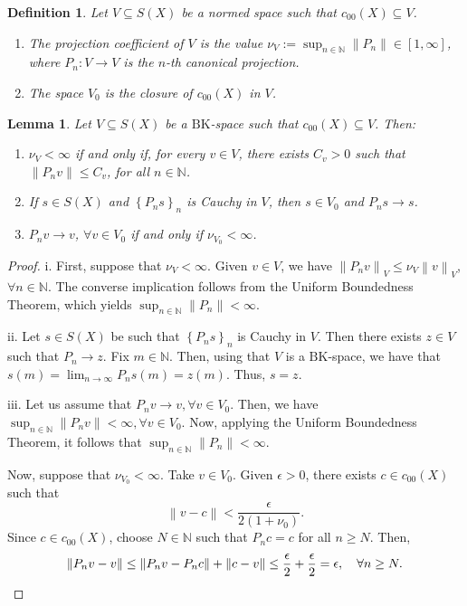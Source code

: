 \documentclass[14pt, a4paper]{article}  %
\providecommand{\llave}[1]{\left\lbrace #1\right\rbrace }
\providecommand{\pare}[1]{\left( #1\right) }
\providecommand{\norm}[1]{\left\lVert#1\right\rVert}
\newcommand{\tien}{\rightarrow}
\newcommand{\N}{\mathbb{N}}
\newcommand{\BK}{\text{BK}}
\newtheorem{lemma}{Lemma}[section]
\newtheorem{definition}{Definition}[section]
\begin{document}
	
	
	
	\begin{definition}\label{naty22}
		Let $V\subseteq S\pare{X}$ be a normed space such that $c_{00}\pare{X}\subseteq V$.
		\begin{enumerate}
			\item The \emph{projection coefficient of $V$} is the value $\nu_{V}:=\sup_{n\in \N}\norm{P_{n}}\in[1,\infty]$, where $P_{n}:V\tien V$ is the $n$-th canonical projection.
			\item The space $V_{0}$ is the closure of $c_{00}(X)$ in $V$.
		\end{enumerate}
	\end{definition}
	
	
	
 	
	
	\begin{lemma}\label{efren27_2}
		Let $V \subseteq S\pare{X}$ be a $\BK$-space such that $c_{00}\pare{X} \subseteq V$. Then:
		\begin{enumerate}
			\item[i.]  $\nu_V < \infty$ if and only if, for every $v \in V$, there exists $C_v > 0$ such that $\| P_n v \| \leq C_v$, for all $n \in \N$.
			\item[ii.] If $s \in S\pare{X}$ and $\llave{P_{n}s}_{n}$ is Cauchy in $V$, then $s \in V_{0}$ and $P_{n}s \to s$.
			\item[iii.] $P_{n}v \to v$, $\forall v \in V_{0}$ if and only if $\nu_{V_{0}} < \infty$.
		\end{enumerate}  
	\end{lemma}
	\begin{proof}i. First, suppose that $\nu_V < \infty$. Given $v\in V$, we have
	$
		\norm{P_{n}v}_{V}\leq \nu_{V}\norm{v}_{V}$,  $\forall n\in \N.
	$  The converse implication follows from the Uniform Boundedness Theorem, which yields
	$
	\sup_{n \in \mathbb{N}} \norm{P_{n}} < \infty.
	$
		
		ii. Let $s \in S\pare{X}$ be such that $\llave{P_{n}s}_{n}$ is Cauchy in $V$. Then there exists $z \in V$ such that $P_{n} \to z$. Fix $m \in \N$. Then, using  that $V$ is a $\BK$-space, we have that $s\pare{m} = \lim_{n \to \infty} P_{n}s\pare{m} = z\pare{m}.$
		Thus, $s = z$.
		
		iii. Let us assume that $P_{n} v \tien v, \forall v \in V_{0}$. Then, we have $\sup_{n \in \mathbb{N}} \norm{P_{n}v} < \infty, \forall v \in V_{0}$. Now, applying the Uniform Boundedness Theorem, it follows that $\sup_{n \in \mathbb{N}} \norm{P_{n}} < \infty$.
		
		Now, suppose that $\nu_{V_{0}} < \infty$. Take $v \in V_{0}$. Given $\epsilon > 0$, there exists $c \in c_{00}\pare{X}$ such that
		\begin{equation}
			\norm{v - c} < \frac{\epsilon}{2\pare{1 + \nu_{0}}}.
		\end{equation}
		Since $c \in c_{00}\pare{X}$, choose $N \in \N$ such that $P_{n}c = c$ for all $n \geq N$. Then,
		$$
		\norm{P_{n}v - v} \leq \norm{P_{n}v - P_{n}c} + \norm{c - v} \leq \frac{\epsilon}{2} + \frac{\epsilon}{2} = \epsilon, \quad \forall n \geq N.\qedhere
		$$\qedhere
	\end{proof}
	
\end{document}
